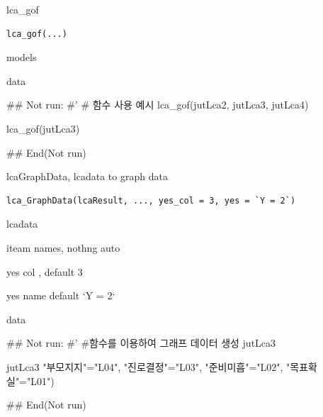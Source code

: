 \documentclass[a4paper]{book}
\begin{document}
%
\begin{Description}
lca\_gof
\end{Description}
%
\begin{Usage}
\begin{verbatim}
lca_gof(...)
\end{verbatim}
\end{Usage}
%
\begin{Arguments}
\begin{ldescription}
\item[\code{...}] models
\end{ldescription}
\end{Arguments}
%
\begin{Value}
data
\end{Value}
%
\begin{Examples}
\begin{ExampleCode}

\#\# Not run: 
#'
# 함수 사용 예시
lca_gof(jutLca2, jutLca3, jutLca4)

lca_gof(jutLca3)%

## End(Not run)
\end{ExampleCode}
\end{Examples}

%
\begin{Description}
lcaGraphData, lcadata to graph data
\end{Description}
%
\begin{Usage}
\begin{verbatim}
lca_GraphData(lcaResult, ..., yes_col = 3, yes = `Y = 2`)
\end{verbatim}
\end{Usage}
%
\begin{Arguments}
\begin{ldescription}
\item[\code{lcaResult}] lcadata

\item[\code{...}] iteam names, nothng auto

\item[\code{yes\_col}] yes col , default 3

\item[\code{yes}] yes name default `Y = 2`
\end{ldescription}
\end{Arguments}
%
\begin{Value}
data
\end{Value}
%
\begin{Examples}
\begin{ExampleCode}
\#\# Not run: 
#'
#함수를 이용하여 그래프 데이터 생성
jutLca3 %

jutLca3 %
                         "부모지지"="L04",
                         "진로결정"="L03",
                         "준비미흡"="L02",
                         "목표확실"="L01")


## End(Not run)

\end{ExampleCode}
\end{Examples}
\end{document}
